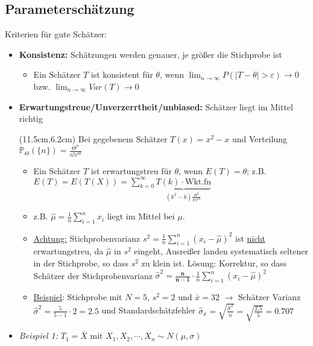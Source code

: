 \subsection{Parameterschätzung}

Kriterien für gute Schätzer:
\begin{itemize}
    \item \textbf{Konsistenz:} Schätzungen werden genauer, je größer die Stichprobe ist
    \begin{itemize}
        \item Ein Schätzer \(T\) ist konsistent für \(\theta\), wenn \(\lim_{n\rightarrow\infty}P(|T-\theta|>\varepsilon)\rightarrow 0\) bzw. \(\lim_{n\rightarrow\infty}Var(T)\rightarrow 0\)
    \end{itemize}
    \item \textbf{Erwartungstreue/Unverzerrtheit/unbiased:} Schätzer liegt im Mittel richtig
    \begin{textblock*}{5cm}(11.5cm,6.2cm) %
        \footnotesize{Bei gegebenem Schätzer \(T(x)=x^2-x\) und Verteilung \(\mathbb{P}_\Theta(\{n\})=\frac{\Theta^n}{n!e^\Theta}\)}
     \end{textblock*}
    \begin{itemize}
        \item Ein Schätzer \(T\) ist erwartungstreu für \(\theta\), wenn \(E(T)=\theta\); z.B. \(E(T)=E(T(X))=\sum_{k=0}^{\infty}\underbrace{T(k)\cdot\text{Wkt.fn}}_{(k^2-k)\frac{\Theta^k}{k!e^\Theta}}\)
        \item z.B. \(\hat{\mu}=\frac{1}{n}\sum_{i=1}^{n}x_i\) liegt im Mittel bei \(\mu\). 
        \item \underline{Achtung:} Stichprobenvarianz \(s^2=\frac{1}{n}\sum_{i=1}^{n}(x_i-\hat{\mu})^2\) ist \underline{nicht} erwartungstreu, da \(\hat{\mu}\) in \(s^2\) eingeht, Ausreißer landen systematisch seltener in der Stichprobe, so dass \(s^2\) zu klein ist. Lösung: Korrektur, so dass Schätzer der Stichprobenvarianz \(\hat{\sigma}^2=\mathbf{\frac{n}{n-1}}\cdot\frac{1}{n}\sum_{i=1}^{n}(x_i-\hat{\mu})^2\)
        \item \underline{Beispiel}: Stichprobe mit \(N=5\text{, }s^2=2 \text{ und } \bar{x}=32\) \(\rightarrow\) Schätzer Varianz \(\hat{\sigma}^2=\frac{5}{5-1}\cdot 2=2.5\) und Standardschätzfehler \(\hat{\sigma}_{\bar{x}}=\sqrt{\frac{\hat{\sigma}^2}{n}}=\sqrt{\frac{2.5}{5}}=0.707\)
    \end{itemize}
    \item \emph{Beispiel 1:} \(T_1=\bar{X}\text{ mit }X_1, X_2, \cdots, X_n\sim N(\mu, \sigma)\)

\end{itemize}
